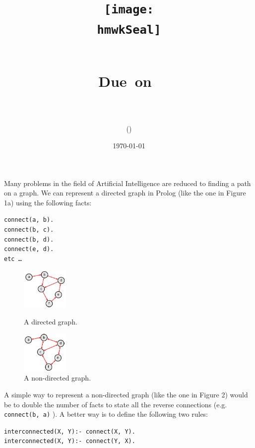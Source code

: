 \documentclass{article}
\title{
	\centering
	\texttt{[image: \\hmwkSeal]}
	
	\vspace{1in}
	\textmd{\textbf{\hmwkClass\ \hmwkTitle}}\\
	
	\normalsize\vspace{0.1in}\small{Due\ on\ \hmwkDueDate}\\
	
	\vspace{0.1in}
	\large{\textit{\hmwkClassInstructor}} \\
	\vspace{0.5in}
	
	\large{\hmwkUniversity}
	
	\vspace{3in}
	
	\author{\textbf{\hmwkAuthorName} (\hmwkAuthorID)}
	\date{\today}
}
\def\code#1{\texttt{#1}}
\begin{document}
	\maketitle
	
	\pagebreak
	
Many problems in the field of Artificial Intelligence are reduced to finding a path on a graph. We can represent a directed graph in Prolog (like the one in Figure 1a) using the following facts: \\

\begin{center}
\code{connect(a, b).} \\
\code{connect(b, c).} \\
\code{connect(b, d).} \\
\code{connect(e, d).} \\
\code{etc …} \\
\end{center}
		
\begin{figure}
	\begin{center}
		\includegraphics[width=0.2\textwidth]{images/fig1a.png}
	\end{center}
	\caption{A directed graph.}
		\begin{center}
		\includegraphics[width=0.2\textwidth]{images/fig1b.png}
	\end{center}
	\caption{A non-directed graph.}
\end{figure}

A simple way to represent a non-directed graph (like the one in Figure 2) would be to double the number of facts to state all the reverse connections (e.g. \code{connect(b, a)} ). A better way is to define the following two rules: \\

\begin{center}
	\code{interconnected(X, Y):- connect(X, Y).} \\
	\code{interconnected(X, Y):- connect(Y, X).} \\
\end{center}
\end{document}

